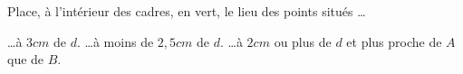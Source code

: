 %
%
Place, à l'intérieur des cadres, en vert, le lieu des points situés \dots
  \begin{tasks}
    \task \dots à $3cm$ de $d$.
    \task \dots à moins de $2,5cm$ de $d$.
    \task \dots à $2cm$ ou plus de $d$ et plus proche de $A$ que de $B$.
  \end{tasks}

